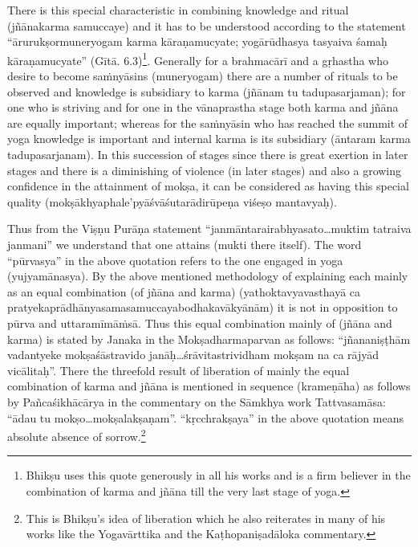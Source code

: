 There is this special characteristic in combining knowledge and ritual (jñānakarma samuccaye) and it has to be understood according to the statement “ārurukṣormuneryogam karma kāraṇamucyate; yogārūdhasya tasyaiva śamaḥ kāraṇamucyate” (Gītā. 6.3)\footnote{Bhikṣu uses this quote generously in all his works and is a firm believer in the combination of karma and jñāna till the very last stage of yoga.}. Generally for a brahmacārī and a gṛhastha who desire to become saṁnyāsins (muneryogam) there are a number of rituals to be observed and knowledge is subsidiary to karma (jñānam tu tadupasarjaman); for one who is striving and for one in the vānaprastha stage both karma and jñāna are equally important; whereas for the saṁnyāsin who has reached the summit of yoga knowledge is important and internal karma is its subsidiary (āntaram karma tadupasarjanam). In this succession of stages since there is great exertion in later stages and there is a diminishing of violence (in later stages) and also a growing confidence in the attainment of mokṣa, it can be considered as having this special quality (mokṣākhyaphale’pyāśvāśutarādirūpeṇa viśeṣo mantavyaḥ).

Thus from the Viṣṇu Purāṇa statement “janmāntarairabhyasato…muk\-tim tatraiva janmani” we understand that one attains (mukti there itself). The word “pūrvasya” in the above quotation refers to the one engaged in yoga (yujyamānasya). By the above mentioned methodology of explaining each mainly as an equal combination (of jñāna and karma) (yathoktavyavasthayā ca pratyekaprādhānyasamasamuccayabodhakavākyānām) it is not in opposition to pūrva and uttaramīmāṁsā. Thus this equal combination mainly of (jñāna and karma) is stated by Janaka in the Mokṣadharmaparvan as follows: “jñananiṣṭhām vadantyeke mokṣaśāstravido janāḥ…śrāvitastrividham mokṣam na ca rājyād vicālitaḥ”. There the threefold result of liberation of mainly the equal combination of karma and jñāna is mentioned in sequence (krameṇāha) as follows by Pañcaśikhācārya in the commentary on the Sāmkhya work Tattvasamāsa: “ādau tu mokṣo…mokṣalakṣaṇam”. “kṛcchrakṣaya” in the above quotation means absolute absence of sorrow.\footnote{This is Bhikṣu’s idea of liberation which he also reiterates in many of his works like the Yogavārttika and the Kaṭhopaniṣadāloka commentary.}  

